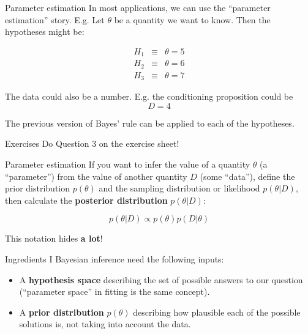 \documentclass{beamer}
\begin{document}
\begin{frame}[t]{Parameter estimation}
In most applications, we can use the ``parameter estimation'' story. E.g.
Let $\theta$ be a quantity we want to know. Then the hypotheses might be:

\begin{eqnarray}
H_1 &\equiv& \theta = 5\\
H_2 &\equiv& \theta = 6\\
H_3 &\equiv& \theta = 7
\end{eqnarray}

The data could also be a number. E.g. the conditioning proposition could be
\begin{equation}
D = 4
\end{equation}

The previous version of Bayes' rule can be applied to each of the
hypotheses.
\end{frame}

\begin{frame}[t]{Exercises}
Do Question 3 on the exercise sheet!
\end{frame}

\begin{frame}[t]{Parameter estimation}
If you want to infer the value of a quantity $\theta$
(a ``parameter'') from the value of
another quantity $D$ (some ``data''),
define the prior distribution $p(\theta)$
and the sampling distribution or likelihood $p(\theta | D)$,
then calculate the {\bf posterior distribution}
$p(\theta | D)$:

\begin{equation}
p(\theta | D) \propto p(\theta)p(D|\theta)
\end{equation}

This notation hides {\bf a lot}!
\end{frame}


\begin{frame}[t]{Ingredients I}
Bayesian inference need the following inputs:

\begin{itemize}
\setlength{\itemsep}{20pt}
\item A {\bf hypothesis space} describing the set of possible answers to our
question (``parameter space'' in fitting is the same concept).
\item A {\bf prior distribution} $p(\theta)$ describing how plausible
each of the possible solutions is, not taking into account the data.
\end{itemize}
\end{frame}
\end{document}
